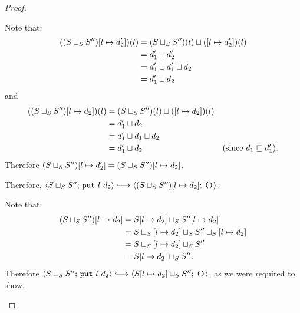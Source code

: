 \begin{proof}
\begin{itemize}
\begin{itemize}

          Note that:
          \begin{align*}
            ((S \sqcup_{S} S'')[l \mapsto d'_2])(l) &=
            (S \sqcup_{S} S'')(l) \sqcup (\left[ l \mapsto d'_2 \right])(l)
            \\ &= d'_1 \sqcup d'_2 \\ &=
            d'_1 \sqcup d'_1 \sqcup d_2 \\ &=
            d'_1 \sqcup d_2
          \end{align*}
          and
          \begin{align*}
            ((S \sqcup_{S} S'')[l \mapsto d_2])(l) &=
            (S \sqcup_{S} S'')(l) \sqcup (\left[ l \mapsto d_2 \right])(l)
            \\ &= d'_1 \sqcup d_2 \\ &=
            d'_1 \sqcup d_1 \sqcup d_2 \\ &=
            d'_1 \sqcup d_2 & \textrm{(since $d_1 \sqsubseteq
              d'_1$).}
          \end{align*}
          Therefore $(S \sqcup_{S} S'')[l \mapsto d'_2] =
          (S \sqcup_{S} S'')[l \mapsto d_2]$.

          Therefore, $\config{\lubstore{S}{S''}}{\putexp{l}{d_2}}
          \parstepsto
          \config{\extSRaw{(\lubstore{S}{S''})}{l}{d_2}}{\unit}$.
      \end{itemize}

      Note that:
      \begin{align*}
        (S \sqcup_{S} S'')[l \mapsto d_2] &=
        S[l \mapsto d_2] \sqcup_{S} S''[l \mapsto d_2] \\ &=
        S \sqcup_{S} \left[ l \mapsto d_2 \right] \sqcup_{S} S'' \sqcup_{S} \left[ l \mapsto d_2 \right]
        \\ &=
        S \sqcup_{S} \left[ l \mapsto d_2 \right] \sqcup_{S} S''
        \\ &= S[l \mapsto d_2] \sqcup_{S} S''.
      \end{align*}
      Therefore $\config{\lubstore{S}{S''}}{\putexp{l}{d_2}}
      \parstepsto
      \config{\lubstore{\extSRaw{S}{l}{d_2}}{S''}}{\unit}$, as we were
      required to show.


\end{itemize}
\end{proof}
